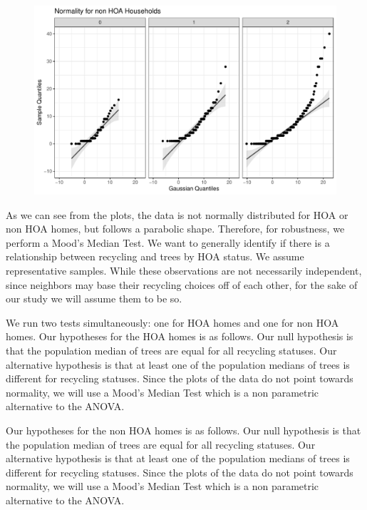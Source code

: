 \documentclass{article}
\begin{document}
	\begin{figure}[H]
		\centering
\includegraphics{exam23-036}
		\label{Fig:plot14}
	\end{figure}
As we can see from the plots\citep{qqplotr}, the data is not normally distributed for HOA or non HOA homes, but follows a parabolic shape. Therefore, for robustness, we perform a Mood's Median Test\citep{RVAideMemoire}. We want to generally identify if there is a relationship between recycling and trees by HOA status. We assume representative samples. While these observations are not necessarily independent, since neighbors may base their recycling choices off of each other, for the sake of our study we will assume them to be so.

We run two tests simultaneously: one for HOA homes and one for non HOA homes.
Our hypotheses for the HOA homes is as follows. Our null hypothesis is that the population median of trees are equal for all recycling statuses. Our alternative hypothesis is that at least one of the population medians of trees is different for recycling statuses. Since the plots of the data do not point towards normality, we will use a Mood's Median Test which is a non parametric alternative to the ANOVA.

Our hypotheses for the non HOA homes is as follows. Our null hypothesis is that the population median of trees are equal for all recycling statuses. Our alternative hypothesis is that at least one of the population medians of trees is different for recycling statuses. Since the plots of the data do not point towards normality, we will use a Mood's Median Test which is a non parametric alternative to the ANOVA.
\end{document}
